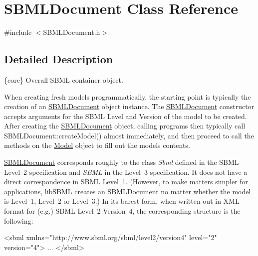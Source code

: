 \hypertarget{class_s_b_m_l_document}{}\section{S\+B\+M\+L\+Document Class Reference}
\label{class_s_b_m_l_document}


{\ttfamily \#include $<$S\+B\+M\+L\+Document.\+h$>$}



\subsection{Detailed Description}
\{core\} Overall S\+B\+ML container object.

When creating fresh models programmatically, the starting point is typically the creation of an \hyperlink{class_s_b_m_l_document}{S\+B\+M\+L\+Document} object instance. The \hyperlink{class_s_b_m_l_document}{S\+B\+M\+L\+Document} constructor accepts arguments for the S\+B\+ML Level and Version of the model to be created. After creating the \hyperlink{class_s_b_m_l_document}{S\+B\+M\+L\+Document} object, calling programs then typically call S\+B\+M\+L\+Document\+::create\+Model() almost immediately, and then proceed to call the methods on the \hyperlink{class_model}{Model} object to fill out the model\textquotesingle{}s contents.

\hyperlink{class_s_b_m_l_document}{S\+B\+M\+L\+Document} corresponds roughly to the class {\itshape Sbml} defined in the S\+B\+ML Level~2 specification and {\itshape S\+B\+ML} in the Level~3 specification. It does not have a direct correspondence in S\+B\+ML Level~1. (However, to make matters simpler for applications, lib\+S\+B\+ML creates an \hyperlink{class_s_b_m_l_document}{S\+B\+M\+L\+Document} no matter whether the model is Level~1, Level~2 or Level~3.) In its barest form, when written out in X\+ML format for (e.\+g.) S\+B\+ML Level~2 Version~4, the corresponding structure is the following\+: \begin{DoxyVerb}<sbml xmlns="http://www.sbml.org/sbml/level2/version4" level="2" version="4">
  ...
</sbml>\end{DoxyVerb}


